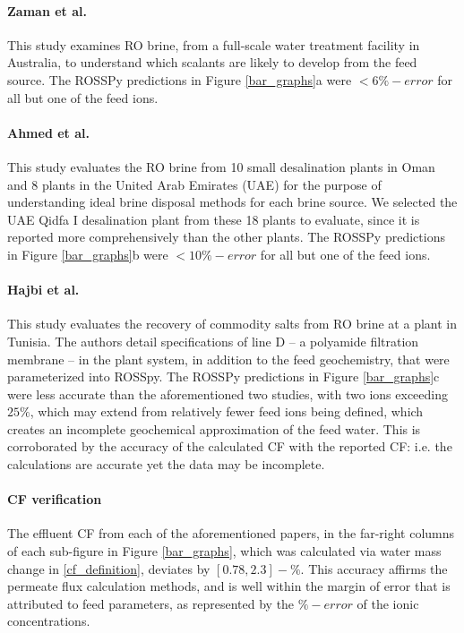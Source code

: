 \documentclass[journal=ACSES&TWater,manuscript=article]{achemso}
\begin{document}
\paragraph{Zaman et al.\cite{Zaman2015DownstreamCompounds}}
This study  examines RO brine, from a full-scale water treatment facility in Australia, to understand which scalants are likely to develop from the feed source. The ROSSPy predictions in Figure \ref{bar_graphs}a were $<6\%-error$ for all but one of the feed ions.

\paragraph{Ahmed et al.\cite{Ahmed2001BrineEmirates}}
This study  evaluates the RO brine from 10 small desalination plants in Oman and 8 plants in the United Arab Emirates (UAE) for the purpose of understanding ideal brine disposal methods for each brine source. We selected the UAE Qidfa I desalination plant from these 18 plants to evaluate, since it is reported more comprehensively than the other plants. The ROSSPy predictions in Figure \ref{bar_graphs}b were $<10\%-error$ for all but one of the feed ions.

\paragraph{Hajbi et al.\cite{Hajbi2010ReuseBrine}}
This study  evaluates the recovery of commodity salts from RO brine at a plant in Tunisia. The authors detail specifications of line D -- a polyamide filtration membrane -- in the plant system, in addition to the feed geochemistry, that were parameterized into ROSSpy.  The ROSSPy predictions in Figure \ref{bar_graphs}c were less accurate than the aforementioned two studies, with two ions exceeding $25\%$, which may extend from relatively fewer feed ions being defined, which creates an incomplete geochemical approximation of the feed water. This is corroborated by the accuracy of the calculated CF with the reported CF: i.e. the calculations are accurate yet the data may be incomplete.

\paragraph{CF verification}
The effluent CF from each of the aforementioned papers, in the far-right columns of each sub-figure in Figure \ref{bar_graphs}, which was calculated via water mass change in \cref{cf_definition}, deviates by $[0.78, 2.3]-\%$. This accuracy affirms the permeate flux calculation methods, and is well within the margin of error that is attributed to feed parameters, as represented by the $\%-error$ of the ionic concentrations.
\end{document}

